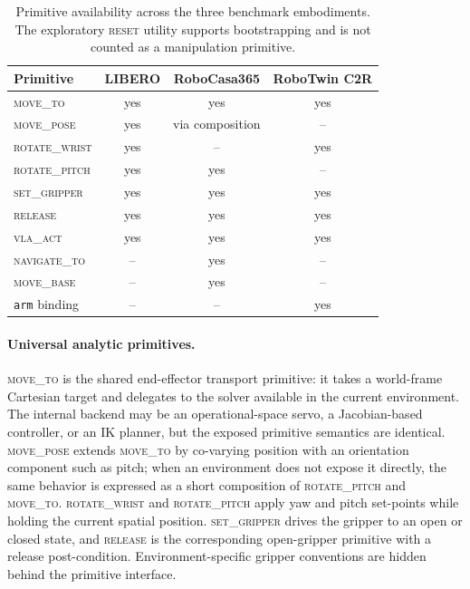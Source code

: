 \documentclass[11pt]{article}
\begin{document}
\begin{table}[h]
\centering
\caption{Primitive availability across the three benchmark embodiments. The exploratory \textsc{reset} utility supports bootstrapping and is not counted as a manipulation primitive.}
\label{tab:app_primitive_availability}
\small
\setlength{\tabcolsep}{5pt}
\begin{tabular}{lccc}
\toprule
Primitive & LIBERO & RoboCasa365 & RoboTwin C2R \\
\midrule
\textsc{move\_to}       & yes & yes & yes \\
\textsc{move\_pose}     & yes & via composition & -- \\
\textsc{rotate\_wrist}  & yes & -- & yes \\
\textsc{rotate\_pitch}  & yes & yes & -- \\
\textsc{set\_gripper}   & yes & yes & yes \\
\textsc{release}        & yes & yes & yes \\
\textsc{vla\_act}       & yes & yes & yes \\
\midrule
\textsc{navigate\_to}   & -- & yes & -- \\
\textsc{move\_base}     & -- & yes & -- \\
\texttt{arm} binding    & -- & -- & yes \\
\bottomrule
\end{tabular}
\end{table}

\paragraph{Universal analytic primitives.}
\textsc{move\_to} is the shared end-effector transport primitive: it takes a world-frame Cartesian target and delegates to the solver available in the current environment. The internal backend may be an operational-space servo, a Jacobian-based controller, or an IK planner, but the exposed primitive semantics are identical. \textsc{move\_pose} extends \textsc{move\_to} by co-varying position with an orientation component such as pitch; when an environment does not expose it directly, the same behavior is expressed as a short composition of \textsc{rotate\_pitch} and \textsc{move\_to}. \textsc{rotate\_wrist} and \textsc{rotate\_pitch} apply yaw and pitch set-points while holding the current spatial position. \textsc{set\_gripper} drives the gripper to an open or closed state, and \textsc{release} is the corresponding open-gripper primitive with a release post-condition. Environment-specific gripper conventions are hidden behind the primitive interface.
\end{document}
